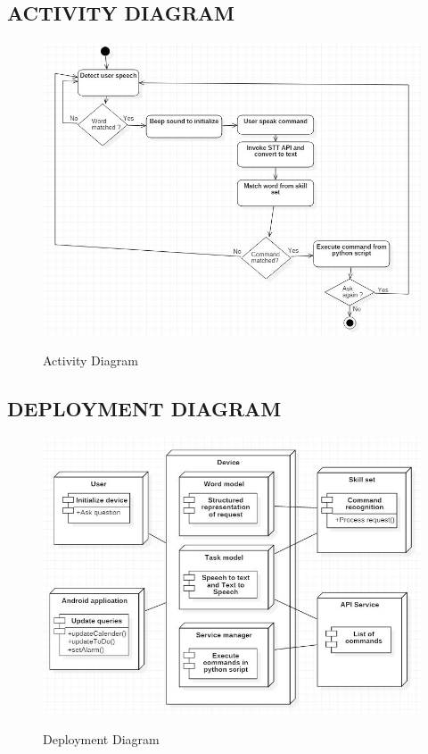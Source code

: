 \documentclass[12pt]{extreport}
\begin{document}
    \subsection{ACTIVITY DIAGRAM}
    \begin{figure}[H]
  \centering
  \includegraphics[scale=0.75]{Activity.JPG}\\
  \caption{Activity Diagram}
\end{figure}
   \pagebreak 
   
    \subsection{DEPLOYMENT DIAGRAM}
     \begin{figure}[H]
  \centering
  \includegraphics[scale=0.75]{Deployment.JPG}\\
  \caption{Deployment Diagram}
  \end{figure}
  \pagebreak
    
\end{document}
